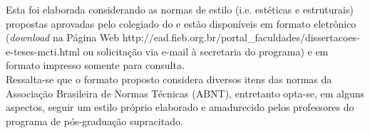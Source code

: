 \begin{notaestilo}
Esta \thetypeworkthree foi elaborada considerando as normas de
estilo (i.e. est\'eticas e estruturais) propostas aprovadas pelo
colegiado do \thefacultytwo e est\~ao dispon\'iveis em formato
eletr\^onico ({\it download} na P\'agina Web
http:$//$ead.fieb.org.br$/$portal\_faculdades$/$dissertacoes-e-teses-mcti.html
ou solicita\c{c}\~ao via e-mail \`a secretaria do
programa) e em formato impresso somente para consulta. \\

Ressalta-se que o formato proposto considera diversos itens das
normas da Associa\c{c}\~ao Brasileira de Normas T\'ecnicas (ABNT),
entretanto opta-se, em alguns aspectos, seguir um estilo pr\'oprio
elaborado e amadurecido pelos professores do programa de
p\'os-gradua\c{c}\~ao supracitado.

\end{notaestilo}
